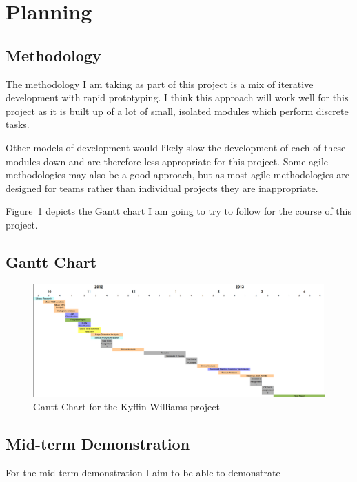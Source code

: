 \documentclass[11pt,fleqn,twoside]{article}
\begin{document}
\section{Planning}

\subsection{Methodology}
The methodology I am taking as part of this project is a mix of iterative development with rapid
prototyping. I think this approach will work well for this project as it is built up of a lot of 
small, isolated modules which perform discrete tasks.

Other models of development would likely slow the development of each of these modules down and are
therefore less appropriate for this project. Some agile methodologies may also be a good approach,
but as most agile methodologies are designed for teams rather than individual projects they are
inappropriate.

Figure~\ref{fig:gantt} depicts the Gantt chart I am going to try to follow for the course of this
project.


\clearpage
\newpage
\subsection{Gantt Chart}
\begin{figure}[H]
\includegraphics[scale=0.45, angle=90]{img/gantt.png}
\caption{Gantt Chart for the Kyffin Williams project}
\label{fig:gantt}
\end{figure}

\clearpage
\subsection{Mid-term Demonstration}
For the mid-term demonstration I aim to be able to demonstrate


%
\end{document}

